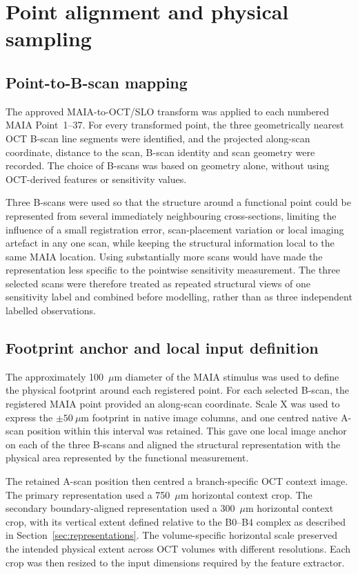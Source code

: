 \section{Point alignment and physical sampling}
\label{sec:footprint}

\subsection{Point-to-B-scan mapping}

The approved MAIA-to-OCT/SLO transform was applied to each numbered MAIA Point~1--37. For every transformed point, the three geometrically nearest OCT B-scan line segments were identified, and the projected along-scan coordinate, distance to the scan, B-scan identity and scan geometry were recorded. The choice of B-scans was based on geometry alone, without using OCT-derived features or sensitivity values.

Three B-scans were used so that the structure around a functional point could be represented from several immediately neighbouring cross-sections, limiting the influence of a small registration error, scan-placement variation or local imaging artefact in any one scan, while keeping the structural information local to the same MAIA location. Using substantially more scans would have made the representation less specific to the pointwise sensitivity measurement. The three selected scans were therefore treated as repeated structural views of one sensitivity label and combined before modelling, rather than as three independent labelled observations.

\subsection{Footprint anchor and local input definition}

The approximately 100~$\mu$m diameter of the MAIA stimulus was used to define the physical footprint around each registered point. For each selected B-scan, the registered MAIA point provided an along-scan coordinate. Scale X was used to express the $\pm50~\mu$m footprint in native image columns, and one centred native A-scan position within this interval was retained. This gave one local image anchor on each of the three B-scans and aligned the structural representation with the physical area represented by the functional measurement.

The retained A-scan position then centred a branch-specific OCT context image. The primary representation used a 750~$\mu$m horizontal context crop. The secondary boundary-aligned representation used a 300~$\mu$m horizontal context crop, with its vertical extent defined relative to the B0--B4 complex as described in Section~\ref{sec:representations}. The volume-specific horizontal scale preserved the intended physical extent across OCT volumes with different resolutions. Each crop was then resized to the input dimensions required by the feature extractor.

